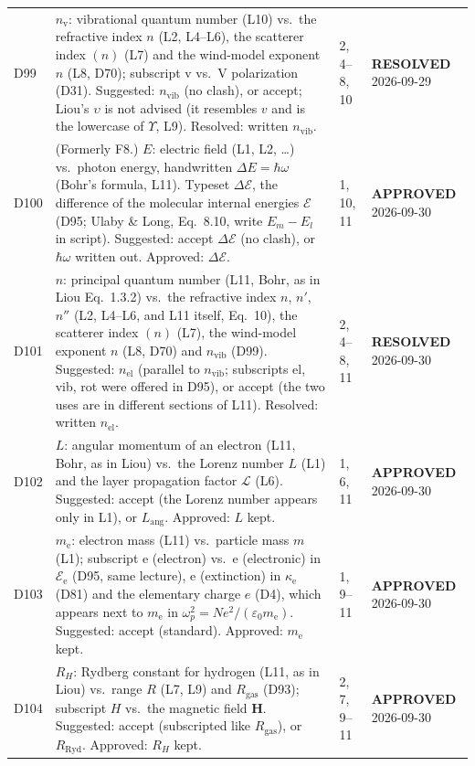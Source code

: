 \documentclass[11pt, oneside]{article}
\newcommand{\approved}{\textbf{APPROVED}}
\newcommand{\resolved}{\textbf{RESOLVED}}
\begin{document}
\begin{longtable}{l >{\raggedright\arraybackslash}p{} l l}
D99 & $n_\mathrm{v}$: vibrational quantum number (L10) vs.\ the refractive index $n$ (L2, L4--L6), the scatterer index $(n)$ (L7) and the wind-model exponent $n$ (L8, D70); subscript v vs.\ V polarization (D31). Suggested: $n_\mathrm{vib}$ (no clash), or accept; Liou's $\upsilon$ is not advised (it resembles $v$ and is the lowercase of $\Upsilon$, L9). Resolved: written $n_\mathrm{vib}$. & 2, 4--8, 10 & \resolved{} 2026-09-29 \\
D100 & (Formerly F8.) $E$: electric field (L1, L2, \ldots) vs.\ photon energy, handwritten $\Delta E = \hbar\omega$ (Bohr's formula, L11). Typeset $\Delta\mathcal{E}$, the difference of the molecular internal energies $\mathcal{E}$ (D95; Ulaby \& Long, Eq.~8.10, write $E_m - E_l$ in script). Suggested: accept $\Delta\mathcal{E}$ (no clash), or $\hbar\omega$ written out. Approved: $\Delta\mathcal{E}$. & 1, 10, 11 & \approved{} 2026-09-30 \\
D101 & $n$: principal quantum number (L11, Bohr, as in Liou Eq.~1.3.2) vs.\ the refractive index $n$, $n'$, $n''$ (L2, L4--L6, and L11 itself, Eq.~10), the scatterer index $(n)$ (L7), the wind-model exponent $n$ (L8, D70) and $n_\mathrm{vib}$ (D99). Suggested: $n_\mathrm{el}$ (parallel to $n_\mathrm{vib}$; subscripts el, vib, rot were offered in D95), or accept (the two uses are in different sections of L11). Resolved: written $n_\mathrm{el}$. & 2, 4--8, 11 & \resolved{} 2026-09-30 \\
D102 & $L$: angular momentum of an electron (L11, Bohr, as in Liou) vs.\ the Lorenz number $L$ (L1) and the layer propagation factor $\mathcal{L}$ (L6). Suggested: accept (the Lorenz number appears only in L1), or $L_\mathrm{ang}$. Approved: $L$ kept. & 1, 6, 11 & \approved{} 2026-09-30 \\
D103 & $m_\mathrm{e}$: electron mass (L11) vs.\ particle mass $m$ (L1); subscript e (electron) vs.\ e (electronic) in $\mathcal{E}_\mathrm{e}$ (D95, same lecture), e (extinction) in $\kappa_\mathrm{e}$ (D81) and the elementary charge $e$ (D4), which appears next to $m_\mathrm{e}$ in $\omega_p^2 = Ne^2/(\varepsilon_0m_\mathrm{e})$. Suggested: accept (standard). Approved: $m_\mathrm{e}$ kept. & 1, 9--11 & \approved{} 2026-09-30 \\
D104 & $R_H$: Rydberg constant for hydrogen (L11, as in Liou) vs.\ range $R$ (L7, L9) and $R_\mathrm{gas}$ (D93); subscript $H$ vs.\ the magnetic field $\mathbf{H}$. Suggested: accept (subscripted like $R_\mathrm{gas}$), or $R_\mathrm{Ryd}$. Approved: $R_H$ kept. & 2, 7, 9--11 & \approved{} 2026-09-30 \\

\end{longtable}
\end{document}
